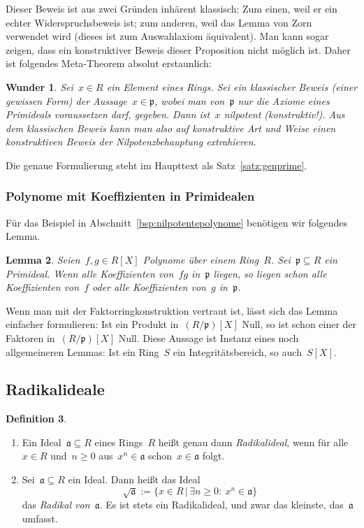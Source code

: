 \documentclass[a4paper,ngerman,12pt]{scrartcl}
\theoremstyle{definition}
\newtheorem{defn}{Definition}[section]
\theoremstyle{plain}
\newtheorem{wunder}[defn]{Wunder}
\newtheorem{lemma}[defn]{Lemma}
\theoremstyle{remark}
\renewcommand{\aa}{\mathfrak{a}}
\newcommand{\pp}{\mathfrak{p}}
\renewcommand{\_}{\mathpunct{.}\,}
\newcommand{\?}{\,{:}\,}
\begin{document}
Dieser Beweis ist aus zwei Gründen inhärent klassisch: Zum einen, weil
er ein echter Widerspruchsbeweis ist; zum anderen, weil das Lemma von Zorn
verwendet wird (dieses ist zum Auswahlaxiom äquivalent). Man kann sogar zeigen,
dass ein konstruktiver Beweis dieser Proposition nicht möglich ist. Daher
ist folgendes Meta-Theorem absolut erstaunlich:

\begin{wunder}Sei~$x \in R$ ein Element eines Rings. Sei ein \emph{klassischer
Beweis} (einer gewissen Form) der Aussage~$x \in \pp$, wobei man von~$\pp$ nur
die Axiome eines Primideals voraussetzen darf, gegeben. Dann ist~$x$ nilpotent
(konstruktiv!). Aus dem klassischen Beweis kann man also auf konstruktive Art
und Weise einen konstruktiven Beweis der Nilpotenzbehauptung extrahieren.
\end{wunder}

Die genaue Formulierung steht im Haupttext als Satz~\ref{satz:genprime}.


\subsubsection*{Polynome mit Koeffizienten in Primidealen}

Für das Beispiel in Abschnitt~\ref{bsp:nilpotentepolynome} benötigen wir
folgendes Lemma.
\begin{lemma}\label{produktprim}Seien~$f,g \in R[X]$ Polynome über einem Ring~$R$. Sei~$\pp
\subseteq R$ ein Primideal. Wenn alle Koeffizienten von~$fg$ in~$\pp$ liegen,
so liegen schon alle Koeffizienten von~$f$ oder alle Koeffizienten von~$g$
in~$\pp$.\end{lemma}
Wenn man mit der Faktorringkonstruktion vertraut ist, lässt sich das Lemma
einfacher formulieren: Ist ein Produkt in~$(R/\pp)[X]$ Null, so ist schon einer
der Faktoren in~$(R/\pp)[X]$ Null. Diese Aussage ist Instanz eines noch
allgemeineren Lemmas: Ist ein Ring~$S$ ein Integritätsbereich, so auch~$S[X]$.


\subsection{Radikalideale}

\begin{defn}\label{def:radikal}\begin{enumerate}
\item Ein Ideal~$\aa \subseteq R$ eines Rings~$R$ heißt genau dann
\emph{Radikalideal}, wenn für alle~$x
\in R$ und~$n \geq 0$ aus~$x^n \in \aa$ schon~$x \in \aa$ folgt.
\item Sei~$\aa \subseteq R$ ein Ideal. Dann heißt das Ideal
\[ \sqrt{\aa} := \{ x \in R \,|\, \exists n \geq 0{:}\ x^n \in \aa \} \]
das \emph{Radikal von~$\aa$}. Es ist stets ein Radikalideal, und zwar das
kleinste, das~$\aa$ umfasst.
\end{enumerate}\end{defn}
\end{document}
